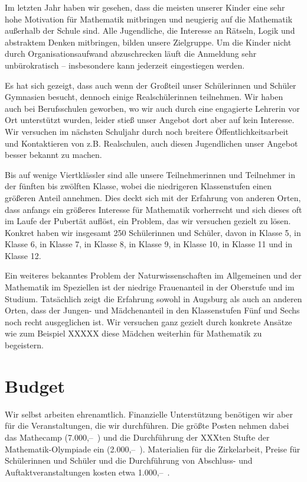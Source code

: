 \documentclass[12pt]{zettel}
\begin{document}
Im letzten Jahr haben wir gesehen, dass die meisten unserer Kinder eine
sehr hohe Motivation für Mathematik mitbringen und neugierig auf die
Mathematik außerhalb der Schule sind. Alle Jugendliche, die Interesse an
Rätseln, Logik und abstraktem Denken mitbringen, bilden unsere
Zielgruppe. Um die Kinder nicht durch Organisationsaufwand abzuschrecken
läuft die Anmeldung sehr unbürokratisch -- insbesondere kann jederzeit
eingestiegen werden.

Es hat sich gezeigt, dass auch wenn der Großteil unser Schülerinnen und
Schüler Gymnasien besucht, dennoch einige Realschülerinnen teilnehmen.
Wir haben auch bei Berufsschulen geworben, wo wir auch durch eine
engagierte Lehrerin vor Ort unterstützt wurden, leider stieß unser
Angebot dort aber auf kein Interesse. Wir versuchen im nächsten
Schuljahr durch noch breitere Öffentlichkeitsarbeit und Kontaktieren von
z.B. Realschulen, auch diesen Jugendlichen unser Angebot besser bekannt
zu machen.

Bis auf wenige Viertklässler sind alle unsere Teilnehmerinnen und
Teilnehmer in der fünften bis zwölften Klasse, wobei die niedrigeren
Klassenstufen einen größeren Anteil annehmen. Dies deckt sich mit der
Erfahrung von anderen Orten, dass anfangs ein größeres Interesse für
Mathematik vorherrscht und sich dieses oft im Laufe der Pubertät
auflöst, ein Problem, das wir versuchen gezielt zu lösen. Konkret haben
wir insgesamt 250 Schülerinnen und Schüler, davon in Klasse 5, in Klasse
6, in Klasse 7, in Klasse 8, in Klasse 9, in Klasse 10, in Klasse 11 und
in Klasse 12.

Ein weiteres bekanntes Problem der Naturwissenschaften im Allgemeinen
und der Mathematik im Speziellen ist der niedrige Frauenanteil in der
Oberstufe und im Studium. Tatsächlich zeigt die Erfahrung sowohl in
Augsburg als auch an anderen Orten, dass der Jungen- und Mädchenanteil
in den Klassenstufen Fünf und Sechs noch recht ausgeglichen ist. Wir
versuchen ganz gezielt durch konkrete Ansätze wie zum Beispiel XXXXX
diese Mädchen weiterhin für Mathematik zu begeistern.


\section{Budget}

Wir selbst arbeiten ehrenamtlich. Finanzielle Unterstützung benötigen wir aber
für die Veranstaltungen, die wir durchführen. Die größte Posten nehmen dabei das
Mathecamp (7.000,--~\texteuro) und die Durchführung der XXXten Stufte der
Mathematik-Olympiade ein (2.000,--~\texteuro). Materialien für die
Zirkelarbeit, Preise für Schülerinnen und Schüler und die Durchführung von
Abschluss- und Auftaktveranstaltungen kosten etwa 1.000,--~\texteuro.
\end{document}
